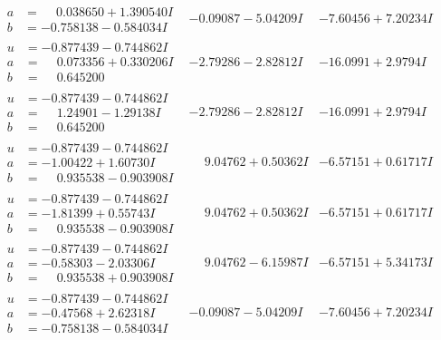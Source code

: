 \documentclass[1p]{elsarticle_modified}
\theoremstyle{definition}
\begin{document}
$$\begin{array}{c|c|c}
\begin{aligned}
a &= \phantom{-}0.038650 + 1.390540 I \\
b &= -0.758138 - 0.584034 I\end{aligned}
 & -0.09087 - 5.04209 I & -7.60456 + 7.20234 I \\ \hline\begin{aligned}
u &= -0.877439 - 0.744862 I \\
a &= \phantom{-}0.073356 + 0.330206 I \\
b &= \phantom{-}0.645200\phantom{ +0.000000I}\end{aligned}
 & -2.79286 - 2.82812 I & -16.0991 + 2.9794 I \\ \hline\begin{aligned}
u &= -0.877439 - 0.744862 I \\
a &= \phantom{-}1.24901 - 1.29138 I \\
b &= \phantom{-}0.645200\phantom{ +0.000000I}\end{aligned}
 & -2.79286 - 2.82812 I & -16.0991 + 2.9794 I \\ \hline\begin{aligned}
u &= -0.877439 - 0.744862 I \\
a &= -1.00422 + 1.60730 I \\
b &= \phantom{-}0.935538 - 0.903908 I\end{aligned}
 & \phantom{-}9.04762 + 0.50362 I & -6.57151 + 0.61717 I \\ \hline\begin{aligned}
u &= -0.877439 - 0.744862 I \\
a &= -1.81399 + 0.55743 I \\
b &= \phantom{-}0.935538 - 0.903908 I\end{aligned}
 & \phantom{-}9.04762 + 0.50362 I & -6.57151 + 0.61717 I \\ \hline\begin{aligned}
u &= -0.877439 - 0.744862 I \\
a &= -0.58303 - 2.03306 I \\
b &= \phantom{-}0.935538 + 0.903908 I\end{aligned}
 & \phantom{-}9.04762 - 6.15987 I & -6.57151 + 5.34173 I \\ \hline\begin{aligned}
u &= -0.877439 - 0.744862 I \\
a &= -0.47568 + 2.62318 I \\
b &= -0.758138 - 0.584034 I\end{aligned}
 & -0.09087 - 5.04209 I & -7.60456 + 7.20234 I \\ \hline\begin{aligned}

\end{aligned}
\end{array}$$
\end{document}

